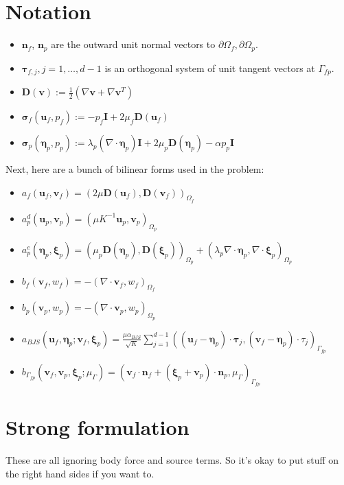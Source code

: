 \documentclass{article}
\newcommand{\mathspace}[1]{\ensuremath{#1}\xspace} %
\newcommand{\D}{\mathspace{\mathbf{D}}}
\newcommand{\sigmabf}{\mathspace{\boldsymbol{\sigma}}}
\newcommand{\grad}{\mathspace{\nabla}}
\renewcommand{\div}{\mathspace{\nabla \cdot}}
\newcommand{\inner}[2]{\mathspace{\left (#1, #2 \right)}}
\newcommand{\defeq}{\mathspace{:=}}
\newcommand{\taubf}{\mathspace{\boldsymbol{\tau}}}
\newcommand{\stokes}{\mathspace{\Omega_{f}}}
\newcommand{\darcy}{\mathspace{\Omega_{p}}}
\newcommand{\interface}{\mathspace{\Gamma_{fp}}}
\newcommand{\nf}{\mathspace{\mathbf{n}_f}}
\newcommand{\np}{\mathspace{\mathbf{n}_p}}
\newcommand{\uf}{\mathspace{\mathbf{u}_f}}
\newcommand{\vf}{\mathspace{\mathbf{v}_f}}
\newcommand{\up}{\mathspace{\mathbf{u}_p}}
\newcommand{\vp}{\mathspace{\mathbf{v}_p}}
\newcommand{\pf}{\mathspace{p_f}}
\newcommand{\pp}{\mathspace{p_p}}
\newcommand{\wf}{\mathspace{w_f}}
\renewcommand{\wp}{\mathspace{w_p}}
\newcommand{\disp}{\mathspace{\boldsymbol{\eta}_p}}
\newcommand{\disptest}{\mathspace{\boldsymbol{\xi}_p}}
\newcommand{\multtest}{\mathspace{\mu_{\Gamma}}}
\begin{document}
\section{Notation}
\begin{itemize}
\item \nf, \np are the outward unit normal vectors to $\partial \stokes, \partial \darcy$. 
\item $\taubf_{f, j}, j = 1, \ldots, d-1$ is an orthogonal system of unit tangent vectors at \interface.
\item $\D(\mathbf{v}) \defeq \frac 12 (\grad \mathbf{v} + \grad \mathbf{v}^T)$
\item $\sigmabf_f(\uf, \pf) \defeq -\pf \mathbf{I} + 2 \mu_f \D(\uf)$
\item $\sigmabf_p(\disp, \pp) \defeq \lambda_p (\div \disp)\mathbf{I}  + 2 \mu_p \D(\disp) - \alpha \pp \mathbf{I} $
\end{itemize}

Next, here are a bunch of bilinear forms used in the problem: 
\begin{itemize}
\item $a_f(\uf, \vf) = \inner{2\mu \D(\uf)} {\D(\vf)}_{\stokes}$
\item $a_p^d(\up, \vp) = \inner{\mu K^{-1}\up} {\vp}_{\darcy}$
\item $a_p^e(\disp, \disptest) = \inner{\mu_p \D(\disp)} {\D(\disptest)}_{\darcy} + \inner{\lambda_p \div \disp} {\div \disptest}_{\darcy}$
\item $b_f(\vf, \wf) = -\inner{\div \vf}{\wf}_{\stokes}$
\item $b_p(\vp, \wp) = -\inner{\div \vp}{\wp}_{\darcy}$
  
\item $a_{BJS}(\uf, \disp; \vf, \disptest) = \frac {\mu \alpha_{BJS}} {\sqrt{K}} \sum_{j=1}^{d-1} \inner{(\uf - \disp) \cdot \taubf_j}{ (\vf - \disp) \cdot \tau_j}_{\interface} $
\item $b_{\interface}(\vf, \vp, \disptest; \multtest) = \inner{\vf \cdot \nf + (\disptest + \vp) \cdot \np}{\multtest}_{\interface}$
  
\end{itemize}


\section{Strong formulation}
These are all ignoring body force and source terms. So it's okay to put stuff on the right hand sides if you want to.
\end{document}
